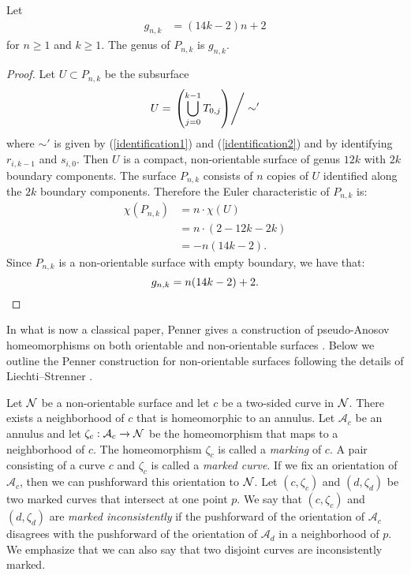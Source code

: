 \begin{lem}
\label{lem:genera}
Let
\begin{align*}
    g_{n,k} &= (14k - 2)n + 2
\end{align*} for $n \geq 1$ and $k \geq 1$.
    The genus of $P_{n,k}$ is $g_{n,k}$.
\end{lem}
\begin{proof}
  Let $U \subset P_{n,k}$ be the subsurface
  \begin{align*}
    U = \left. \left( \bigcup_{j =0}^{k-1} T_{0,j} \right)\right/\sim'
  \end{align*}
  where $\sim'$ is given by (\ref{identification1}) and (\ref{identification2}) and by identifying $r_{i,k-1}$ and $s_{i,0}$.
  Then $U$ is a compact, non-orientable surface of genus $12k$ with $2k$ boundary components. 
  The surface $P_{n,k}$ consists of $n$ copies of $U$ identified along the $2k$ boundary components.  Therefore the Euler characteristic of $P_{n,k}$ is:
  \begin{align*}
    \chi(P_{n,k}) &= n \cdot \chi(U)\\
                  &=n\cdot(2-12k-2k)\\
                  &= -n(14k - 2).
  \end{align*}
  Since $P_{n,k}$ is a non-orientable surface with empty boundary, we have that:
  \begin{equation*}
    g_{n,k} = n(14k-2) + 2. \qedhere
  \end{equation*}
\end{proof}

In what is now a classical paper, Penner gives a construction of pseudo-Anosov homeomorphisms on both orientable and non-orientable surfaces \cite{penner1988construction}.  Below we outline the Penner construction for non-orientable surfaces following the details of Liechti--Strenner \cite[Section 2]{LS}.



  Let $\mathcal{N}$ be a non-orientable surface and let $c$ be a two-sided curve in $\mathcal{N}$.  There exists a neighborhood of $c$ that is homeomorphic to an annulus.  Let $\mathcal{A}_c$ be an annulus and let $\zeta_c: \mathcal{A}_c \xrightarrow{} \mathcal{N}$ be the homeomorphism that maps to a neighborhood of $c$.  The homeomorphism $\zeta_c$ is called a \textit{marking} of $c$. A pair consisting of a curve $c$ and $\zeta_c$ is called a {\it marked curve}.
 If we fix an
orientation of $\mathcal{A}_c$, then we can pushforward this orientation to $\mathcal{N}$. Let
$(c,\zeta_c)$ and $(d,\zeta_d)$ be two marked curves that intersect at one point $p$.  We say that $(c,\zeta_c)$ and $(d,\zeta_d)$ are {\it marked inconsistently} if the
pushforward of the orientation of $\mathcal{A}_c$ disagrees with the pushforward of the orientation of $\mathcal{A}_d$ in a neighborhood of $p$.  We emphasize that we can also say that two disjoint curves are inconsistently marked.

